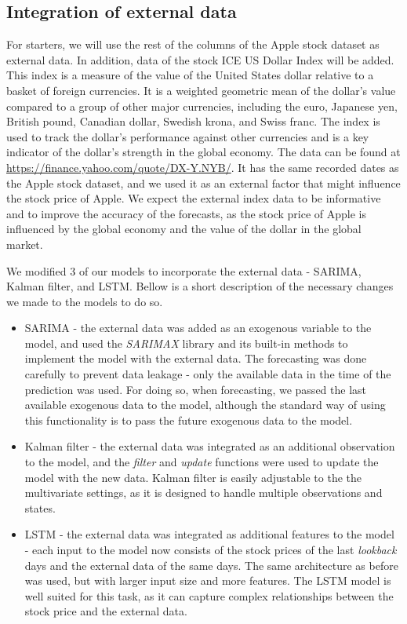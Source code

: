 \documentclass[12pt]{article}
\theoremstyle{definition}
\begin{document}
\subsection{Integration of external data}
For starters, we will use the rest of the columns of the Apple stock dataset as external data.
In addition, data of the stock ICE US Dollar Index will be added. This index is a measure of the value of the United States dollar relative to a basket of foreign currencies. 
It is a weighted geometric mean of the dollar's value compared to a group of other major currencies, including the euro, Japanese yen, British pound, Canadian dollar, Swedish krona, and Swiss franc. 
The index is used to track the dollar's performance against other currencies and is a key indicator of the dollar's strength in the global economy. 
The data can be found at \url{https://finance.yahoo.com/quote/DX-Y.NYB/}.
It has the same recorded dates as the Apple stock dataset, and we used it as an external factor that might influence the stock price of Apple. 
We expect the external index data to be informative and to improve the accuracy of the forecasts, as the stock price of Apple is influenced by the global economy and the value of the dollar in the global market.

We modified 3 of our models to incorporate the external data - SARIMA, Kalman filter, and LSTM.
Bellow is a short description of the necessary changes we made to the models to do so.
\begin{itemize}
  \item SARIMA - the external data was added as an exogenous variable to the model, and used the \textit{SARIMAX} library and its built-in methods to implement the model with the external data. 
  The forecasting was done carefully to prevent data leakage - only the available data in the time of the prediction was used.
  For doing so, when forecasting, we passed the last available exogenous data to the model, although the standard way of using this functionality is to pass the future exogenous data to the model.
  \item Kalman filter - the external data was integrated as an additional observation to the model, and the \textit{filter} and \textit{update} functions were used to update the model with the new data. 
  Kalman filter is easily adjustable to the the multivariate settings, as it is designed to handle multiple observations and states.
  \item LSTM - the external data was integrated as additional features to the model - each input to the model now consists of the stock prices of the last \textit{lookback} days and the external data of the same days. 
  The same architecture as before was used, but with larger input size and more features.
  The LSTM model is well suited for this task, as it can capture complex relationships between the stock price and the external data.
\end{itemize}
\end{document}

